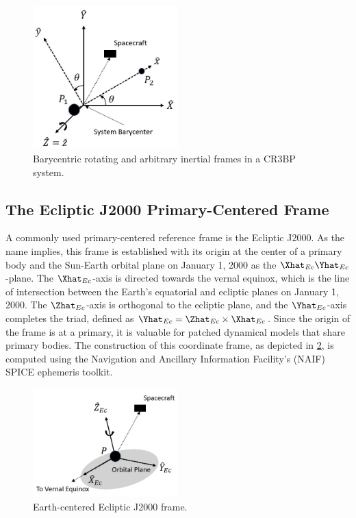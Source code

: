 \begin{figure}[ht]
    \centering
    \includegraphics[width=0.5\textwidth]{figures/BaryFrames.jpg}
    \caption{Barycentric rotating and arbitrary inertial frames in a CR3BP system.}
    \label{fig:baryFrames}
\end{figure}

\subsection{The Ecliptic J2000 Primary-Centered Frame}
A commonly used primary-centered reference frame is the Ecliptic J2000. As the name implies, this
frame is established with its origin at the center of a primary body and the Sun-Earth orbital
plane on January 1, 2000 as the $\Xhat_{Ec}\Yhat_{Ec}$-plane. The $\Xhat_{Ec}$-axis is directed
towards the vernal equinox, which is the line of intersection between the Earth's equatorial and
ecliptic planes on January 1, 2000. The $\Zhat_{Ec}$-axis is orthogonal to the ecliptic plane, and
the $\Yhat_{Ec}$-axis completes the triad, defined as $\Yhat_{Ec}=\Zhat_{Ec}\times\Xhat_{Ec}$.
Since the origin of the frame is at a primary, it is valuable for patched dynamical models that
share primary bodies. The construction of this coordinate frame, as depicted in
\cref{fig:eclipJ2000Frame}, is computed using the Navigation and Ancillary Information Facility's
(NAIF) SPICE ephemeris toolkit\cite{Semenov:2023}.

\begin{figure}[ht]
    \centering
    \includegraphics[width=0.5\textwidth]{figures/EclipJ2000Frame.jpg}
    \caption{Earth-centered Ecliptic J2000 frame.}
    \label{fig:eclipJ2000Frame}
\end{figure}
